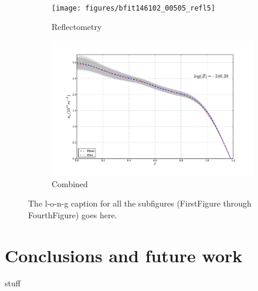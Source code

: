 \documentclass	[12pt]{article}
\begin{document}
\begin{figure}[ht!]
\begin{subfigure}[b]{0.5\textwidth}
		\label{fig:inter505}
	\end{subfigure} \\%
	\begin{subfigure}[b]{0.5\textwidth}
		\centering
		\texttt{[image: figures/bfit146102\_00505\_refl5]}
		\vspace{-30pt}
		\caption{Reflectometry}
		\label{fig:refl505}
	\end{subfigure}
	\hspace{-20pt}
	\begin{subfigure}[b]{0.5\textwidth}
		\centering
		\includegraphics[width=\textwidth,keepaspectratio=true]{figures/bfit146102_00505_all5}
		\vspace{-30pt}
		\caption{Combined}
		\label{fig:all505}
	\end{subfigure}
	\caption{The l-o-n-g caption for all the subfigures (FirstFigure through FourthFigure) goes here.}
	\label{fig:dne505}
\end{figure}
\section{Conclusions and future work}
stuff



\end{document}
